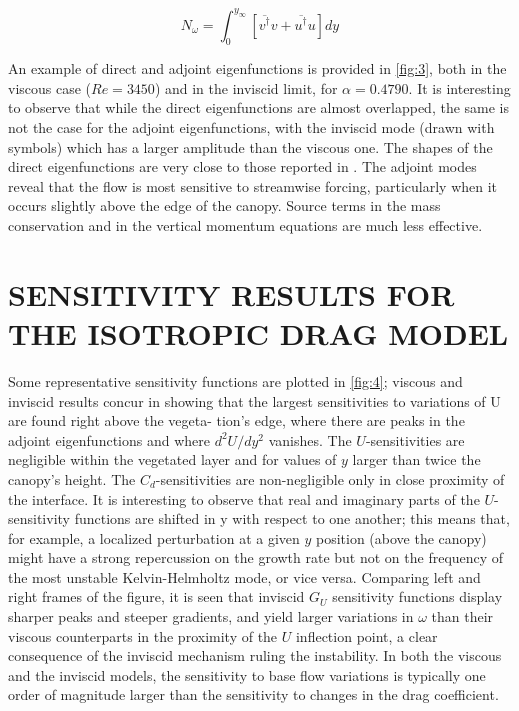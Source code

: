 \begin{equation}
N_{\omega} = \int_0^{y_{\infty}} \left[ \overline{ v^{\dagger}} v  +  \overline{ u^{\dagger}} u \right] dy
\label{eq:norm}
\end{equation}

An example of direct and adjoint eigenfunctions is provided in \ref{fig:3}, both in the viscous case
($Re = 3450$) and in the inviscid limit, for $\alpha = 0.4790$. It is interesting to observe that while the
direct eigenfunctions are almost overlapped, the same is not the case for the adjoint eigenfunctions,
with the inviscid mode (drawn with symbols) which has a larger amplitude than the viscous one.
The shapes of the direct eigenfunctions are very close to those reported in \cite{zampogna2016instability}. The adjoint modes
reveal that the flow is most sensitive to streamwise forcing, particularly when it occurs slightly
above the edge of the canopy. Source terms in the mass conservation and in the vertical momentum
equations are much less effective.


\section{SENSITIVITY RESULTS FOR THE ISOTROPIC DRAG MODEL}
\label{sec:3}

Some representative sensitivity functions are plotted in \ref{fig:4}; viscous and inviscid results
concur in showing that the largest sensitivities to variations of U are found right above the vegeta-
tion’s edge, where there are peaks in the adjoint eigenfunctions and where $d^2 U/d y^2$ vanishes. The
$U$-sensitivities are negligible within the vegetated layer and for values of $y$ larger than twice the
canopy’s height. The $C_d$-sensitivities are non-negligible only in close proximity of the interface.
It is interesting to observe that real and imaginary parts of the $U$-sensitivity functions are
shifted in y with respect to one another; this means that, for example, a localized perturbation at
a given $y$ position (above the canopy) might have a strong repercussion on the growth rate but not
on the frequency of the most unstable Kelvin-Helmholtz mode, or vice versa. Comparing left and
right frames of the figure, it is seen that inviscid $G_U$ sensitivity functions display sharper peaks and
steeper gradients, and yield larger variations in $\omega$ than their viscous counterparts in the proximity of
the $U$ inflection point, a clear consequence of the inviscid mechanism ruling the instability. In both
the viscous and the inviscid models, the sensitivity to base flow variations is typically one order of
magnitude larger than the sensitivity to changes in the drag coefficient.


